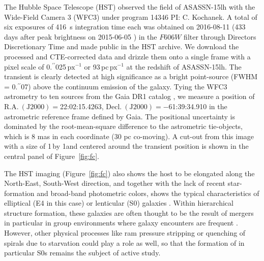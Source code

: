 \documentclass[traditabstract]{aa}
\newcommand{\farc}{\hbox{$.\!\!^{\prime\prime}$}}
\begin{document}
The Hubble Space Telescope (HST) observed the field of ASASSN-15lh with the Wide-Field Camera 3 (WFC3) under program 14346 PI: C. Kochanek. A total of six exposures of 416~s integration time each was obtained on 2016-08-11 (433 days after peak brightness on 2015-06-05 \citealt{2016Sci...351..257D}) in the $F606W$ filter through Directors Discretionary Time and made public in the HST archive. We download the processed and CTE-corrected data and drizzle them onto a single frame with a pixel scale of 0\farc{025}\,$\mathrm{px}^{-1}$ or 93\,pc\,px$^{-1}$ at the redshift of ASASSN-15lh. The transient is clearly detected at high significance as a bright point-source (FWHM = 0\farc{07}) above the continuum emission of the galaxy. Tying the WFC3 astrometry to ten sources from the Gaia DR1 catalog \citep{2016A&A...595A...2G, 2016A&A...595A...1G}, we measure a position of $\mathrm{R.A.~(J2000)}=$22:02:15.4263, $\mathrm{Decl.~(J2000)} = -$61:39:34.910 in the astrometric reference frame defined by Gaia. The positional uncertainty is dominated by the root-mean-square difference to the astrometric tie-objects, which is 8 mas in each coordinate (30 pc co-moving). A cut-out from this image with a size of 1\arcmin\,by 1\arcmin and centered around the transient position is shown in the central panel of Figure~\ref{fig:fc}.

The HST imaging (Figure~\ref{fig:fc}) also shows the host to be elongated along the North-East, South-West direction, and together with the lack of recent star-formation and broad-band photometric colors, shows the typical characteristics of elliptical (E4 in this case) or lenticular (S0) galaxies \citep[e.g.,][]{2009ARA&A..47..159B}. Within hierarchical structure formation, these galaxies are often thought to be the result of mergers in particular in group environments where galaxy encounters are frequent \citep[e.g.,][]{2005A&A...437...69B, 2011MNRAS.415.1783B}. However, other physical processes like ram pressure stripping or quenching of spirals due to starvation could play a role as well, so that the formation of in particular S0s remains the subject of active study.
\end{document}
